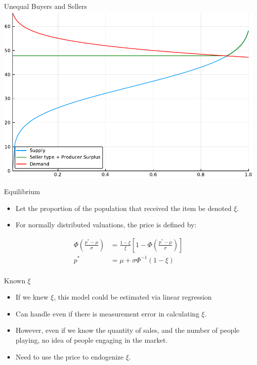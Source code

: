 \documentclass[bigger]{beamer}
\begin{document}
\begin{frame}[label=sec-1-8]{Unequal Buyers and Sellers}
\includegraphics[width=.9\linewidth]{../Scripts/oneTenth.pdf}
\end{frame}

\begin{frame}[label=sec-1-9]{Equilibrium}
\begin{itemize}
\item Let the proportion of the population that received the item be
denoted $\xi$.
\item For normally distributed valuations, the price is defined by:
\end{itemize}

\begin{align*}
\Phi \left ( \frac{ p^* - \mu }{\sigma} \right ) &= \frac{1-\xi}{\xi} \left [ 1 - \Phi \left
( \frac{ p^* - \mu }{\sigma} \right ) \right ]\\
p^* &= \mu + \sigma \Phi^{-1} ( 1- \xi )\\
\end{align*}
\end{frame}


\begin{frame}[label=sec-1-10]{Known $\xi$}
\begin{itemize}
\item If we knew $\xi$, this model could be estimated via linear regression
\item Can handle even if there is measurement error in calculating $\xi$.
\item However, even if we know the quantity of sales, and the number of
people playing, no idea of people engaging in the market.
\item Need to use the price to endogenize $\xi$.
\end{itemize}
\end{frame}
\end{document}
